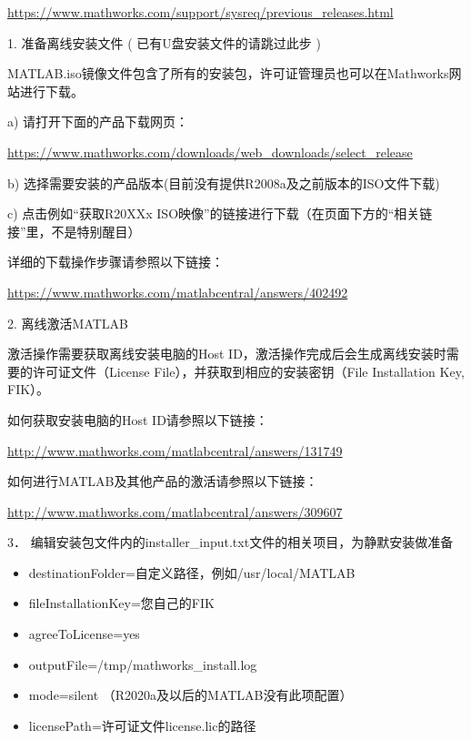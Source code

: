 \documentclass[UTF8]{article}   %
\numberwithin{equation}{section} %
\begin{document}
\href{https://www.mathworks.com/support/sysreq/previous_releases.html}{https://www.mathworks.com/support/sysreq/previous_releases.html}

1.    准备离线安装文件 ( 已有U盘安装文件的请跳过此步 )

MATLAB.iso镜像文件包含了所有的安装包，许可证管理员也可以在Mathworks网站进行下载。

a)    请打开下面的产品下载网页：

\href{https://www.mathworks.com/downloads/web_downloads/select_release}{https://www.mathworks.com/downloads/web_downloads/select_release}

b)    选择需要安装的产品版本(目前没有提供R2008a及之前版本的ISO文件下载)

c)    点击例如“获取R20XXx ISO映像”的链接进行下载（在页面下方的“相关链接”里，不是特别醒目）


详细的下载操作步骤请参照以下链接：

\href{https://www.mathworks.com/matlabcentral/answers/402492}{https://www.mathworks.com/matlabcentral/answers/402492} 

2.    离线激活MATLAB

激活操作需要获取离线安装电脑的Host ID，激活操作完成后会生成离线安装时需要的许可证文件（License File），并获取到相应的安装密钥（File Installation Key, FIK）。

如何获取安装电脑的Host ID请参照以下链接：

\href{http://www.mathworks.com/matlabcentral/answers/131749}{http://www.mathworks.com/matlabcentral/answers/131749} 

如何进行MATLAB及其他产品的激活请参照以下链接：

\href{http://www.mathworks.com/matlabcentral/answers/309607}{http://www.mathworks.com/matlabcentral/answers/309607}

3．    编辑安装包文件内的installer_input.txt文件的相关项目，为静默安装做准备

\begin{itemize}
	\item destinationFolder=自定义路径，例如/usr/local/MATLAB
	\item fileInstallationKey=您自己的FIK
	\item agreeToLicense=yes
	\item outputFile=/tmp/mathworks_install.log
	\item mode=silent （R2020a及以后的MATLAB没有此项配置）
	\item licensePath=许可证文件license.lic的路径
\end{itemize}
\end{document}

